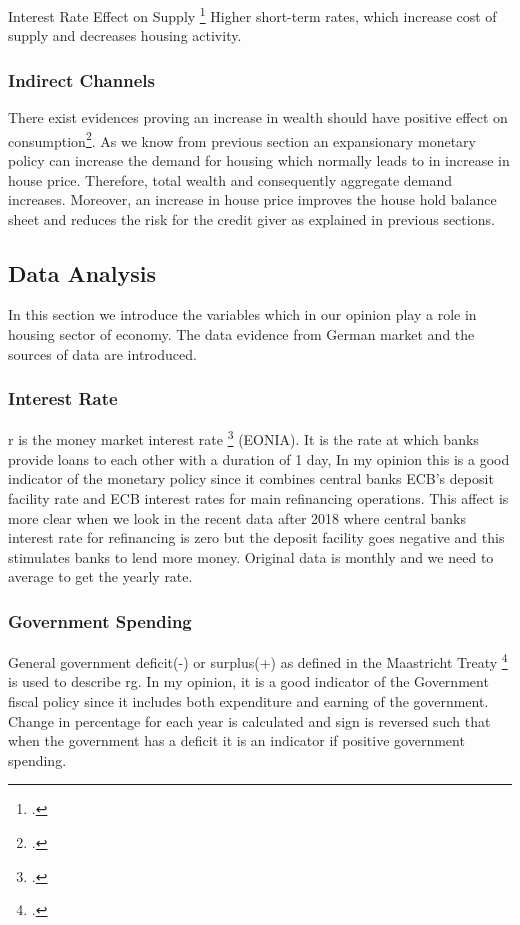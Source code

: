 Interest Rate Effect on Supply \footcite[See.][]{Mishkin2007}
Higher short-term rates, which increase cost of supply and decreases housing activity.

\subsubsection{Indirect Channels}
There exist evidences proving an increase in wealth should have positive effect on consumption\footcite[See.][]{Mishkin2007}. As we know from previous section an expansionary monetary policy can increase the demand for housing which normally leads to in increase in house price. Therefore, total wealth and consequently aggregate demand increases.
Moreover, an increase in house price improves the house hold balance sheet and reduces the risk for the credit giver as explained in previous sections.

\subsection{Data Analysis}\label{sec:Data}
In this section we introduce the variables which in our opinion play a role in housing sector of economy. The data evidence from German market and the sources of data are introduced. 
\subsubsection{Interest Rate} 
\ac{r} is the money market interest rate \footcite[See.][]{BundesBank} (EONIA). It is the rate at which banks provide loans to each other with a duration of 1 day, In my opinion this is a good indicator of the monetary policy since it combines central banks ECB's deposit facility rate and ECB interest rates for main refinancing operations. This affect is more clear when we look in the recent data after 2018 where central banks interest rate for refinancing is zero but the deposit facility goes negative and this stimulates banks to lend more money. Original data is monthly and we need to average to get the yearly rate. 

\subsubsection{Government Spending} 
General government deficit(-) or surplus(+) as defined in the Maastricht Treaty \footcite[See.][]{BundesBank} is used to describe \ac{rg}. In my opinion, it is a good indicator of the Government fiscal policy since it includes both expenditure and earning of the government. Change in percentage for each year is calculated and sign is reversed such that when the government has a deficit it is an indicator if positive government spending.

